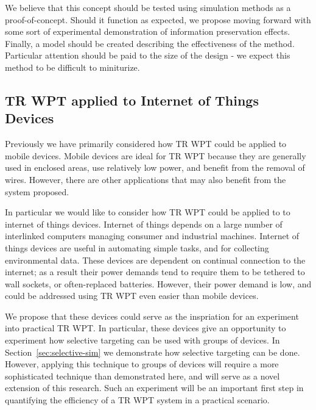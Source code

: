 We believe that this concept should be tested using simulation methods as a proof-of-concept. Should it function as expected, we propose moving forward with some sort of experimental demonstration of information preservation effects. Finally, a model should be created describing the effectiveness of the method. Particular attention should be paid to the size of the design - we expect this method to be difficult to miniturize.

\subsection{TR WPT applied to Internet of Things Devices}
Previously we have primarily considered how TR WPT could be applied to mobile devices. Mobile devices are ideal for TR WPT because they are generally used in enclosed areas, use relatively low power, and benefit from the removal of wires. However, there are other applications that may also benefit from the system proposed.

In particular we would like to consider how TR WPT could be applied to to internet of things devices. Internet of things depends on a large number of interlinked computers managing consumer and industrial machines. Internet of things devices are useful in automating simple tasks, and for collecting environmental data. These devices are dependent on continual connection to the internet; as a result their power demands tend to require them to be tethered to wall sockets, or often-replaced batteries. However, their power demand is low, and could be addressed using TR WPT even easier than mobile devices.

We propose that these devices could serve as the inspriation for an experiment into practical TR WPT. In particular, these devices give an opportunity to experiment how selective targeting can be used with groups of devices. In Section~\ref{sec:selective-sim} we demonstrate how selective targeting can be done. However, applying this technique to groups of devices will require a more sophisticated technique than demonstrated here, and will serve as a novel extension of this research. Such an experiment will be an important first step in quantifying the efficiency of a TR WPT system in a practical scenario.
